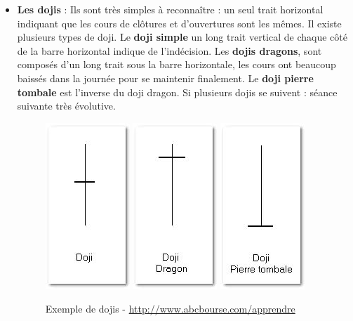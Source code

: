 \begin{itemize}
\item \textbf{Les dojis} : Ils sont très simples à reconnaître : un seul trait horizontal indiquant que les cours de clôtures et d’ouvertures sont les mêmes. Il existe plusieurs types de doji. Le \textbf{doji simple} un long trait vertical de chaque côté de la barre horizontal indique de l’indécision. Les \textbf{dojis dragons}, sont composés d’un long trait sous la barre horizontale, les cours ont beaucoup baissés dans la journée pour se maintenir finalement. Le \textbf{doji pierre tombale} est l’inverse du doji dragon. Si plusieurs dojis se suivent : séance suivante très évolutive.
\begin{figure}[H]
  \center
  \includegraphics[scale=0.5]{../graph/chandelier9.png}
  \includegraphics[scale=0.5]{../graph/chandelier10.png}
  \includegraphics[scale=0.5]{../graph/chandelier11.png}  
  \caption{Exemple de dojis - \url{http://www.abcbourse.com/apprendre}}
\end{figure} 
\end{itemize}


